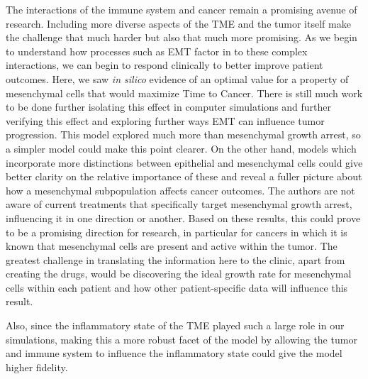 \documentclass[11pt]{article}
\begin{document}


The interactions of the immune system and cancer remain a promising avenue of research.
Including more diverse aspects of the TME and the tumor itself make the challenge that much harder but also that much more promising.
As we begin to understand how processes such as EMT factor in to these complex interactions, we can begin to respond clinically to better improve patient outcomes.
Here, we saw {\it in silico} evidence of an optimal value for a property of mesenchymal cells that would maximize Time to Cancer.
There is still much work to be done further isolating this effect in computer simulations and further verifying this effect and exploring further ways EMT can influence tumor progression.
This model explored much more than mesenchymal growth arrest, so a simpler model could make this point clearer.
On the other hand, models which incorporate more distinctions between epithelial and mesenchymal cells could give better clarity on the relative importance of these and reveal a fuller picture about how a mesenchymal subpopulation affects cancer outcomes.
The authors are not aware of current treatments that specifically target mesenchymal growth arrest, influencing it in one direction or another.
%
Based on these results, this could prove to be a promising direction for research, in particular for cancers in which it is known that mesenchymal cells are present and active within the tumor.
The greatest challenge in translating the information here to the clinic, apart from creating the drugs, would be discovering the ideal growth rate for mesenchymal cells within each patient and how other patient-specific data will influence this result.
\par
Also, since the inflammatory state of the TME played such a large role in our simulations, making this a more robust facet of the model by allowing the tumor and immune system to influence the inflammatory state could give the model higher fidelity.
\end{document}
